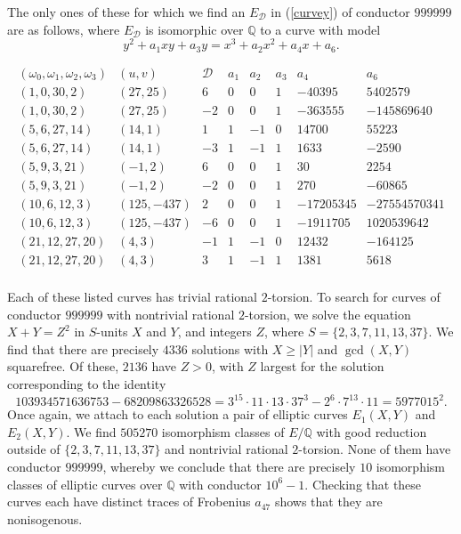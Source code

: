 The only ones of these for which we find an $E_{\mathcal{D}}$ in (\ref{curvey})  of conductor $999999$ are as follows, where $E_{\mathcal{D}}$ is isomorphic over $\mathbb{Q}$ to a curve with model
$$
y^2 + a_1 xy + a_3 y = x^3 + a_2 x^2 + a_4 x + a_6.
$$

$$
\begin{array}{c|c|c|c|c|c|c|c} 
(\omega_0,\omega_1,\omega_2,\omega_3) & (u,v) & \mathcal{D} & a_1 & a_2 & a_3 & a_4 & a_6 \\ \hline
(1,0,30,2) & (27,25) & 6 & 0 & 0 & 1 & -40395 & 5402579  \\
(1,0,30,2) & (27,25) & -2 & 0 & 0 & 1 & -363555 & -145869640  \\
(5,6,27,14) & (14,1) & 1 & 1 & -1 & 0 & 14700 & 55223 \\
(5,6,27,14) & (14,1) & -3 & 1 & -1 & 1 & 1633 & -2590 \\
(5,9,3,21) & (-1,2) & 6 & 0 & 0 & 1 & 30 & 2254 \\
(5,9,3,21) & (-1,2) & -2 & 0 & 0 & 1 & 270 & -60865 \\
(10,6,12,3) & (125,-437) & 2 & 0 & 0 & 1 & -17205345 & -27554570341 \\
(10,6,12,3) & (125,-437) & -6 & 0 & 0 & 1 & -1911705 & 1020539642 \\
(21,12,27,20) & (4,3) & -1 & 1 & -1 & 0 & 12432 & -164125 \\
(21,12,27,20) & (4,3) & 3 & 1 & -1 & 1 & 1381 & 5618 \\
\end{array}
$$ 

Each of these listed curves has trivial rational $2$-torsion. To search for curves of conductor $999999$ with nontrivial rational $2$-torsion, we solve the equation $X+Y=Z^2$ in $S$-units $X$ and $Y$, and integers $Z$, where $S=\{2,3,7, 11,13, 37 \}$.
We find that there are precisely $4336$ solutions with $X \geq |Y|$ and  $\gcd (X,Y)$ squarefree. Of these, $2136$ have $Z > 0$, with $Z$ largest for the solution corresponding to the identity
$$
103934571636753 - 68209863326528 = 3^{15} \cdot 11 \cdot 13 \cdot 37^3 - 2^6 \cdot 7^{13} \cdot 11 =   5977015^2.
$$
Once again, we attach to each solution a pair of elliptic curves $E_1(X,Y)$ and $E_2(X,Y)$. We find $505270$ isomorphism classes of $E/\mathbb{Q}$ with good reduction outside of $\{ 2, 3, 7, 11, 13, 37 \}$ and nontrivial rational $2$-torsion. None of them have  conductor $999999$, whereby we conclude that there are precisely  $10$ isomorphism classes of elliptic curves over $\mathbb{Q}$ with conductor $10^6-1$. Checking that these curves each have distinct traces of Frobenius $a_{47}$ shows that they are nonisogenous.


